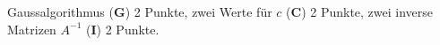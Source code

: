 \begin{bewertung}
Gaussalgorithmus ({\bf G}) 2 Punkte,
zwei Werte für $c$ ({\bf C}) 2 Punkte,
zwei inverse Matrizen $A^{-1}$ ({\bf I}) 2 Punkte.
\end{bewertung}




